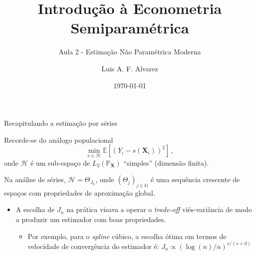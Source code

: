 \documentclass[11pt]{beamer}
\author{Luis A. F. Alvarez}
\title{Introdução à Econometria Semiparamétrica}
\subtitle{Aula 2 - Estimação Não Paramétrica Moderna}
\date{\today}
\newenvironment{halfwideitemize}{\itemize\addtolength{\itemsep}{0.5em}}{\enditemize}
\begin{document}
	\begin{frame}[plain]
	\maketitle
	\end{frame}
	\begin{frame}{Recapitulando a  estimação por séries}
		\begin{halfwideitemize}
			\item Recorde-se do análogo populacional
			$$ \operatorname{min}_{s \in \mathcal{H}}\mathbb{E}[(Y_i - s(\boldsymbol{X}_i))^2]\, ,$$
			onde $\mathcal{H}$ é um sub-espaço de $L_2(\mathbb{P}_{\boldsymbol{X}})$ ``simples'' (dimensão finita).
			\item Na análise de séries, $\mathcal{H} = \Theta_{J_n}$, onde $(\Theta_{j})_{j \in \mathbb{N}}$ é uma sequência crescente de espaços com propriedades de aproximação global.
			\begin{itemize}
				\item A escolha de $J_n$ na prática visava a operar o \textit{trade-off} viés-variância de modo a produzir um estimador com boas propriedades.
				\begin{itemize}
					\item Por exemplo, para o \textit{spline} cúbico, a escolha ótima em termos de velocidade de convergência do estimador é:
					$J_n \propto \left(\log(n)/n\right)^{s/(s+d)}$
				\end{itemize}
			\end{itemize}

		\end{halfwideitemize}
	\end{frame}
	
\end{document}
